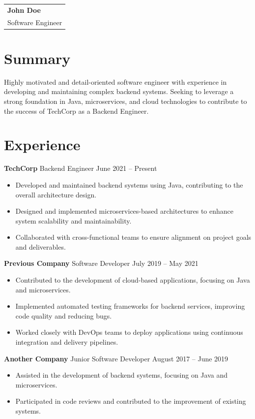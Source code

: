 \documentclass[10pt,a4paper]{article}
\begin{document}
\begin{tabular}{p{14cm}}
\textbf{John Doe} \\
Software Engineer
\end{tabular}

\vspace{1em}

\section*{Summary}
Highly motivated and detail-oriented software engineer with experience in developing and maintaining complex backend systems. Seeking to leverage a strong foundation in Java, microservices, and cloud technologies to contribute to the success of TechCorp as a Backend Engineer.

\vspace{0.5em}

\section*{Experience}

\textbf{TechCorp} \hfill Backend Engineer \hfill June 2021 -- Present
\begin{itemize}[leftmargin=*]
  \item Developed and maintained backend systems using Java, contributing to the overall architecture design.
  \item Designed and implemented microservices-based architectures to enhance system scalability and maintainability.
  \item Collaborated with cross-functional teams to ensure alignment on project goals and deliverables.
\end{itemize}

\vspace{0.5em}
\textbf{Previous Company} \hfill Software Developer \hfill July 2019 -- May 2021
\begin{itemize}[leftmargin=*]
  \item Contributed to the development of cloud-based applications, focusing on Java and microservices.
  \item Implemented automated testing frameworks for backend services, improving code quality and reducing bugs.
  \item Worked closely with DevOps teams to deploy applications using continuous integration and delivery pipelines.
\end{itemize}

\vspace{0.5em}
\textbf{Another Company} \hfill Junior Software Developer \hfill August 2017 -- June 2019
\begin{itemize}[leftmargin=*]
  \item Assisted in the development of backend systems, focusing on Java and microservices.
  \item Participated in code reviews and contributed to the improvement of existing systems.
\end{itemize}
\end{document}
